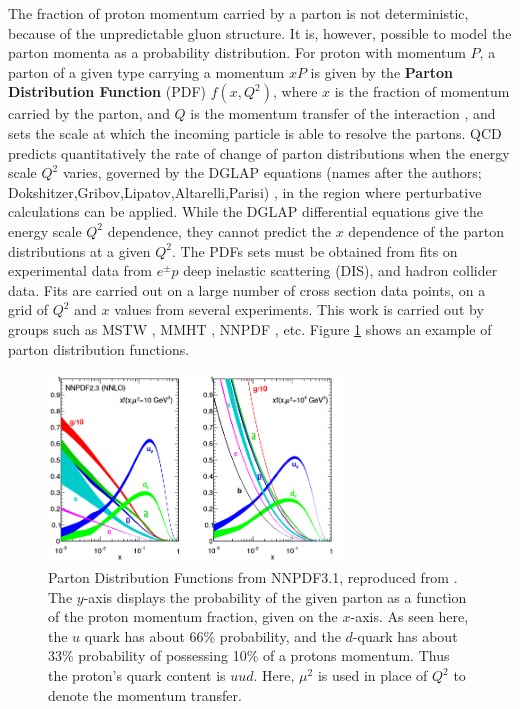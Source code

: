 \documentclass[12pt,a4paper,openright,twoside]{report}
\begin{document}
The fraction of proton momentum carried by a parton is not deterministic, because of the unpredictable gluon structure. It is, however, possible to model the parton momenta as a probability distribution. For proton with momentum $P$, a parton  of a given type carrying a momentum $xP$ is given by the \textbf{Parton Distribution Function} (PDF) $f(x,Q^2)$, where $x$ is the fraction of momentum carried by the parton, and $Q$ is the momentum transfer of the interaction \cite{collider_physics}, and sets the scale at which the incoming particle is able to resolve the partons. QCD predicts quantitatively the rate of change of parton distributions when the energy scale $Q^2$ varies, governed by the DGLAP equations (names after the authors; Dokshitzer,Gribov,Lipatov,Altarelli,Parisi) \cite{DGLAP}, in the region where perturbative calculations can be applied. While the DGLAP differential equations give the energy scale $Q^2$ dependence, they cannot predict the $x$ dependence of the parton distributions at a given $Q^2$. The PDFs sets must be obtained from fits on experimental data from $e^\pm p$ deep inelastic scattering (DIS), and hadron collider data. Fits are carried out on a large number of cross section data points, on a grid of $Q^2$ and $x$ values from several experiments. This work is carried out by groups such as  MSTW \cite{MSTW, MSTW2, MSTW3}, MMHT \cite{MMHT14}, NNPDF \cite{NNPDF}, etc. Figure \ref{fig:NNPDF3} shows an example of parton distribution functions.

\begin{figure}[h]
\centering
\includegraphics[width=0.7\textwidth]{NNPDF3.png}
\caption{Parton Distribution Functions from NNPDF3.1, reproduced from \cite{NNPDF}. The $y$-axis displays the probability of the given parton as a function of the proton momentum fraction, given on the $x$-axis. As seen here, the $u$ quark has about 66\% probability, and the $d$-quark has about 33\% probability of possessing 10\% of a protons momentum. Thus the proton's quark content is $uud$. Here, $\mu^2$ is used in place of $Q^2$ to denote the momentum transfer.}
\label{fig:NNPDF3}
\end{figure}
\end{document}
